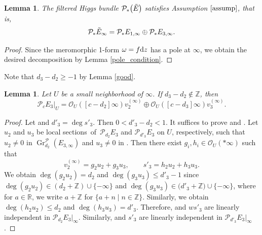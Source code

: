 \documentclass[pdftex]{sigma}
\numberwithin{equation}{section}
\newtheorem{Lemma}[Theorem]{Lemma}
\newcommand{\Z}{\mathbb{Z}}
\newcommand{\R}{\mathbb{R}}
\newcommand{\gr}{\operatorname{\mathrm{Gr}}}
\begin{document}
\begin{Lemma}\label{assump_satisfy}
 The filtered Higgs bundle $\mathcal{P}_*\bigl(\Tilde{E}\bigr)$ satisfies Assumption $\ref{assump}$, that is,
 \begin{equation*}
 \mathcal{P}_*\Tilde{E}_{\infty} = \mathcal{P}_*E_{1,\infty} \oplus \mathcal{P}_*E_{3,\infty}.
 \end{equation*}
\end{Lemma}
\begin{proof}
 Since the meromorphic 1-form $\omega=f{\rm d}z$ has a pole at $\infty$, we obtain the desired decomposition by Lemma \ref{pole_condition}.
\end{proof}

 Note that $d_3-d_2\geq -1$ by Lemma \ref{good}.
\begin{Lemma}\label{case1}
 Let $U$ be a small neighborhood of $\infty$. If $d_3-d_2\notin\Z$, then
 \begin{equation*}
 \mathcal{P}_{c}E_3|_{U} = \mathcal{O}_U([c-d_2]\infty)v^{(\infty)}_2 \oplus \mathcal{O}_U([c-d_3]\infty)v^{(\infty)}_3.
 \end{equation*}
\end{Lemma}
\begin{proof}
 Let  and $d'_3 = \deg{s'_3}$. Then $0<d'_3-d_2<1$. It suffices to prove  and . Let $u_2$ and $u_3$ be local sections~of~$\mathcal{P}_{d_2}E_3$ and $\mathcal{P}_{d'_3}E_3$ on $U$, respectively, such that $u_2\neq 0$ in $\gr^{\mathcal{P}}_{d_2} (E_{3,\infty})$ and $u_3\neq 0$ in \smash{$\gr^{\mathcal{P}}_{d'_3} (E_{3,\infty})$}. Then there exist $g_i,h_i \in \mathcal{O}_U(*\infty)$ such that
 \begin{equation*}
 v^{(\infty)}_2 = g_2 u_2 +g_3 u_3, \qquad s'_3 = h_2 u_2 +h_3 u_3.
 \end{equation*}
 We obtain $\deg{(g_2 u_2)}=d_2$ and $\deg{(g_3 u_3)}\leq d'_3-1$ since $\deg{(g_2 u_2)}\in (d_2 +\Z) \cup \{-\infty\}$ and $\deg{(g_3 u_3)}\in \big(d'_3 +\Z\big) \cup \{-\infty\}$, where for $a\in \R$, we write $a+\Z$ for $\{a+n\mid n\in\Z\}$.
 Similarly, we obtain $\deg{(h_2 u_2)}\leq d_2$ and $\deg{(h_3 u_3)}=d'_3$.
 Therefore,  and $ws'_3$ are linearly independent in $\mathcal{P}_{d_2}E_3|_{\infty}$. Similarly,  and $s'_3$ are linearly independent in ${\mathcal{P}}_{d'_3} E_{3}|_{\infty}$.
\end{proof}
\end{document}
